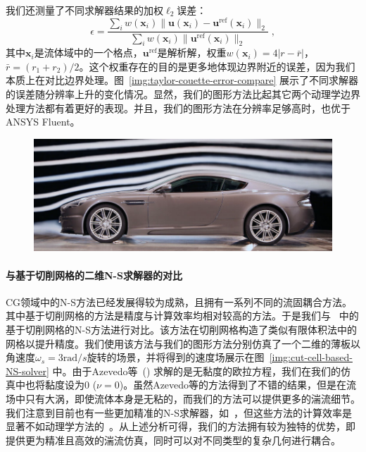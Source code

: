 我们还测量了不同求解器结果的加权$\ell_2$误差：
\begin{equation}\label{eq:error_metric}
\epsilon = \frac{\sum_i w(\bm{x}_i)\|\bm{u}(\bm{x}_i)-\bm{u}^{\text{ref}}(\bm{x}_i)\|_2}{\sum_i w(\bm{x}_i)\|\bm{u}^{\text{ref}}(\bm{x}_i)\|_2}\;,
\end{equation}
其中$\bm{x}_i$是流体域中的一个格点，$\bm{u}^{\text{ref}}$是解析解，权重$w(\bm{x}_i) \!=\! 4|r-\bar{r}|$，$\bar{r}\!=\!(r_1+r_2)/2$。这个权重存在的目的是更多地体现边界附近的误差，因为我们本质上在对比边界处理。图~\ref{img:taylor-couette-error-compare} 展示了不同求解器的误差随分辨率上升的变化情况。显然，我们的图形方法比起其它两个动理学边界处理方法都有着更好的表现。并且，我们的图形方法在分辨率足够高时，也优于ANSYS Fluent。

\begin{figure}[htbp]
  \centering
    \includegraphics[width=0.99\columnwidth]{figures/car_wind_tunnel.png}
  \label{img:car_wind_tunnel}
\end{figure}

\paragraph{与基于切削网格的二维N-S求解器的对比}
CG领域中的N-S方法已经发展得较为成熟，且拥有一系列不同的流固耦合方法。其中基于切削网格的方法是精度与计算效率均相对较高的方法。于是我们与~\cite{Azevedo-2016} 中的基于切削网格的N-S方法进行对比。该方法在切削网格构造了类似有限体积法中的网格以提升精度。我们使用该方法与我们的图形方法分别仿真了一个二维的薄板以角速度$\omega_s = 3 \text{rad}/s$旋转的场景，并将得到的速度场展示在图~\ref{img:cut-cell-based-NS-solver} 中。由于Azevedo等~(\citeyear{Azevedo-2016}) 求解的是无黏度的欧拉方程，我们在我们的仿真中也将黏度设为0 ($\nu\!=\!0$)。虽然Azevedo等的方法得到了不错的结果，但是在流场中只有大涡，即使流体本身是无粘的，而我们的方法可以提供更多的湍流细节。我们注意到目前也有一些更加精准的N-S求解器，如~\cite{zehnder2018advection,qu2019efficient}，但这些方法的计算效率是显著不如动理学方法的~\cite{Li-2020}。从上述分析可得，我们的方法拥有较为独特的优势，即提供更为精准且高效的湍流仿真，同时可以对不同类型的复杂几何进行耦合。

